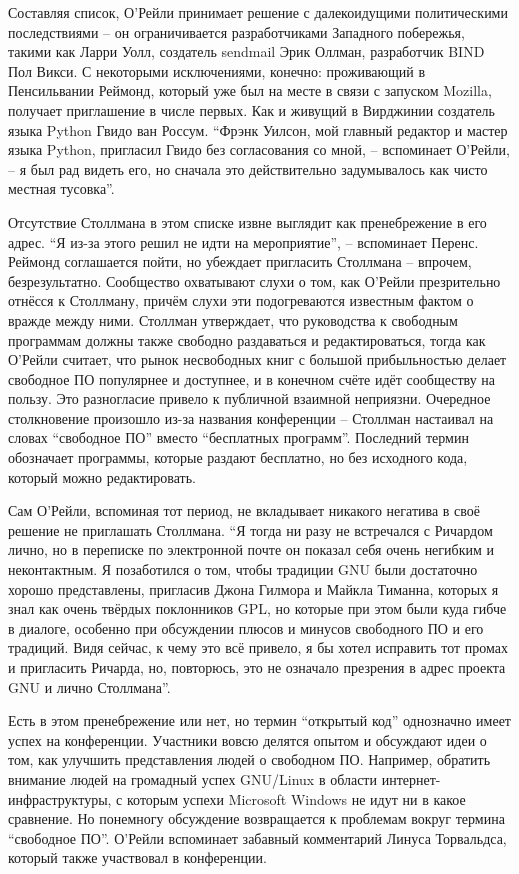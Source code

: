Составляя список, О'Рейли принимает решение с далекоидущими политическими последствиями -- он ограничивается разработчиками Западного побережья, такими как Ларри Уолл, создатель sendmail Эрик Оллман, разработчик BIND Пол Викси. С некоторыми исключениями, конечно: проживающий в Пенсильвании Реймонд, который уже был на месте в связи с запуском Mozilla, получает приглашение в числе первых. Как и живущий в Вирджинии создатель языка Python Гвидо ван Россум. ``Фрэнк Уилсон, мой главный редактор и мастер языка Python, пригласил Гвидо без согласования со мной, -- вспоминает О'Рейли, -- я был рад видеть его, но сначала это действительно задумывалось как чисто местная тусовка''.

Отсутствие Столлмана в этом списке извне выглядит как пренебрежение в его адрес. ``Я из-за этого решил не идти на мероприятие'', -- вспоминает Перенс. Реймонд соглашается пойти, но убеждает пригласить Столлмана -- впрочем, безрезультатно. Сообщество охватывают слухи о том, как О'Рейли презрительно отнёсся к Столлману,  причём слухи эти подогреваются известным фактом о вражде между ними. Столлман утверждает, что руководства к свободным программам должны также свободно раздаваться и редактироваться, тогда как О'Рейли считает, что рынок несвободных книг с большой прибыльностью делает свободное ПО популярнее и доступнее, и в конечном счёте идёт сообществу на пользу. Это разногласие привело к публичной взаимной неприязни. Очередное столкновение произошло из-за названия конференции -- Столлман настаивал на словах ``свободное ПО'' вместо ``бесплатных программ''. Последний термин обозначает программы, которые раздают бесплатно, но без исходного кода, который можно редактировать.

Сам О'Рейли, вспоминая тот период, не вкладывает никакого негатива в своё решение не приглашать Столлмана. ``Я тогда ни разу не встречался с Ричардом лично, но в переписке по электронной почте он показал себя очень негибким и неконтактным. Я позаботился о том, чтобы традиции GNU были достаточно хорошо представлены, пригласив Джона Гилмора и Майкла Тиманна, которых я знал как очень твёрдых поклонников GPL, но которые при этом были куда гибче в диалоге, особенно при обсуждении плюсов и минусов свободного ПО и его традиций. Видя сейчас, к чему это всё привело, я бы хотел исправить тот промах и пригласить Ричарда, но, повторюсь, это не означало презрения в адрес проекта GNU и лично Столлмана''.

Есть в этом пренебрежение или нет, но термин ``открытый код'' однозначно имеет успех на конференции. Участники вовсю делятся опытом и обсуждают идеи о том, как улучшить представления людей о свободном ПО. Например, обратить внимание людей на громадный успех GNU/Linux в области интернет-инфраструктуры, с которым успехи Microsoft Windows не идут ни в какое сравнение. Но понемногу обсуждение возвращается к проблемам вокруг термина ``свободное ПО''. О'Рейли вспоминает забавный комментарий Линуса Торвальдса, который также участвовал в конференции.

